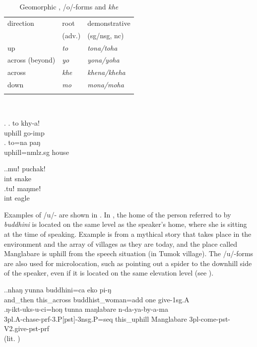\begin{table}[htp]
\begin{centering}
\begin{tabular}{lll}
\lsptoprule
 {\sc direction} & {\sc root } & {\sc demonstrative} \\
  &(adv.) & ({\sc sg/nsg, nc})\\
\midrule
{\sc up}&\emph{to} &\emph{tona/toha} \\
{\sc across (beyond)}&\emph{yo} &\emph{yona/yoha} \\
{\sc across }&\emph{khe}&\emph{khena/kheha} \\
{\sc down}&\emph{mo} &\emph{mona/moha} \\
\lspbottomrule
\end{tabular}\\
\caption{Geomorphic ,  /o/-forms and  \emph{khe} }\label{motoyo}
\end{centering}
\end{table}


\ex. \ag. to khy-a!\\
uphill go{\sc -imp}\\
\bg. to=na paŋ\\
uphill{\sc =nmlz.sg} house\\


\ex.\ag.muǃ puchak!\\
{\sc int} snake\\
\bg.tuǃ maŋmeǃ\\
{\sc int} eagle\\


Examples of /u/- are shown in \Next.  In \Next[a], the home of the person referred to by \emph{buddhini} is located on the same level as the speaker's home, where she is sitting at the time of speaking. Example \Next[b] is from a mythical story that takes place in the environment and the array of villages as they are today, and the place called Manglabare is uphill from the speech situation (in Tumok village). The /u/-forms are also used for microlocation, such as pointing out a spider to the downhill side of the speaker, even if it is located on the same elevation level (see ).

\ex.\ag.nhaŋ    yunna              buddhini=ca        eko pi-ŋ\\
and\_then this\_across buddhist\_woman{\sc =add} one give{\sc [pst]-1sg.A}\\
\bg.ŋ-ikt-uks-u-ci=hoŋ   tunna    maŋlabare n-da-ya-by-a-ma	\\
{\sc 3pl.A-}chase{\sc -prf-3.P[pst]-3nsg.P=seq} this\_uphill Manglabare {\sc 3pl-}come{\sc -pst-V2.give-pst-prf}\\
 (lit. ) 	



